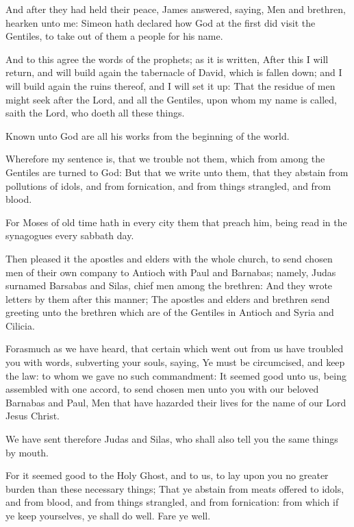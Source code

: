 \verse And after they had held their peace, James answered, saying, Men and brethren, hearken unto me: \verse Simeon hath declared how God at the first did visit the Gentiles, to take out of them a people for his name.

\verse And to this agree the words of the prophets; as it is written, \verse After this I will return, and will build again the tabernacle of David, which is fallen down; and I will build again the ruins thereof, and I will set it up: \verse That the residue of men might seek after the Lord, and all the Gentiles, upon whom my name is called, saith the Lord, who doeth all these things.

\verse Known unto God are all his works from the beginning of the world.

\verse Wherefore my sentence is, that we trouble not them, which from among the Gentiles are turned to God: \verse But that we write unto them, that they abstain from pollutions of idols, and from fornication, and from things strangled, and from blood.

\verse For Moses of old time hath in every city them that preach him, being read in the synagogues every sabbath day.

\verse Then pleased it the apostles and elders with the whole church, to send chosen men of their own company to Antioch with Paul and Barnabas; namely, Judas surnamed Barsabas and Silas, chief men among the brethren: \verse And they wrote letters by them after this manner; The apostles and elders and brethren send greeting unto the brethren which are of the Gentiles in Antioch and Syria and Cilicia.

\verse Forasmuch as we have heard, that certain which went out from us have troubled you with words, subverting your souls, saying, Ye must be circumcised, and keep the law: to whom we gave no such commandment: \verse It seemed good unto us, being assembled with one accord, to send chosen men unto you with our beloved Barnabas and Paul, \verse Men that have hazarded their lives for the name of our Lord Jesus Christ.

\verse We have sent therefore Judas and Silas, who shall also tell you the same things by mouth.

\verse For it seemed good to the Holy Ghost, and to us, to lay upon you no greater burden than these necessary things; \verse That ye abstain from meats offered to idols, and from blood, and from things strangled, and from fornication: from which if ye keep yourselves, ye shall do well. Fare ye well.

